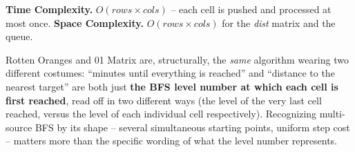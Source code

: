 \begin{complexitybox}
\textbf{Time Complexity.} $O(\textit{rows} \times \textit{cols})$ --
each cell is pushed and processed at most once.
\textbf{Space Complexity.} $O(\textit{rows} \times \textit{cols})$ for
the \textit{dist} matrix and the queue.
\end{complexitybox}

\begin{takeawaybox}
Rotten Oranges and 01 Matrix are, structurally, the \emph{same}
algorithm wearing two different costumes: ``minutes until everything is
reached'' and ``distance to the nearest target'' are both just
\textbf{the BFS level number at which each cell is first reached},
read off in two different ways (the level of the very last cell
reached, versus the level of each individual cell respectively).
Recognizing multi-source BFS by its shape -- several simultaneous
starting points, uniform step cost -- matters more than the specific
wording of what the level number represents.
\end{takeawaybox}
